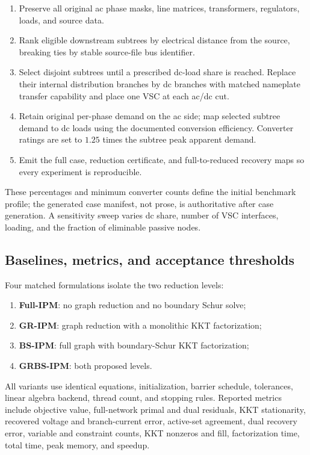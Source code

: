 \documentclass[journal,10pt]{IEEEtran}
\begin{document}
\begin{enumerate}
  \item Preserve all original ac phase masks, line matrices, transformers,
  regulators, loads, and source data.
  \item Rank eligible downstream subtrees by electrical distance from the
  source, breaking ties by stable source-file bus identifier.
  \item Select disjoint subtrees until a prescribed dc-load share is reached.
  Replace their internal distribution branches by dc branches with matched
  nameplate transfer capability and place one VSC at each ac/dc cut.
  \item Retain original per-phase demand on the ac side; map selected subtree
  demand to dc loads using the documented conversion efficiency.  Converter
  ratings are set to $1.25$ times the subtree peak apparent demand.
  \item Emit the full case, reduction certificate, and full-to-reduced recovery
  maps so every experiment is reproducible.
\end{enumerate}

These percentages and minimum converter counts define the initial benchmark
profile; the generated case manifest, not prose, is authoritative after case
generation.  A sensitivity sweep varies dc share, number of VSC interfaces,
loading, and the fraction of eliminable passive nodes.

\subsection{Baselines, metrics, and acceptance thresholds}
Four matched formulations isolate the two reduction levels:
\begin{enumerate}
  \item \textbf{Full-IPM}: no graph reduction and no boundary Schur solve;
  \item \textbf{GR-IPM}: graph reduction with a monolithic KKT factorization;
  \item \textbf{BS-IPM}: full graph with boundary-Schur KKT factorization;
  \item \textbf{GRBS-IPM}: both proposed levels.
\end{enumerate}
All variants use identical equations, initialization, barrier schedule,
tolerances, linear algebra backend, thread count, and stopping rules.  Reported
metrics include objective value, full-network primal and dual residuals, KKT
stationarity, recovered voltage and branch-current error, active-set agreement,
dual recovery error, variable and constraint counts, KKT nonzeros and fill,
factorization time, total time, peak memory, and speedup.
\end{document}
